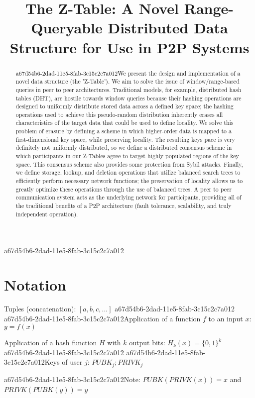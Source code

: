 \documentclass[12pt]{article}
\title{The Z-Table: A Novel Range-Queryable Distributed Data Structure for Use in P2P Systems}
\begin{document}
\maketitle

\begin{abstract}
a67d54b6-2dad-11e5-8fab-3c15c2c7a012We present the design and implementation of a novel data structure (the 'Z-Table'). We aim to solve the issue of window/range-based queries in peer to peer architectures. Traditional models, for example,  distributed hash tables (DHT), are hostile towards window queries because their hashing operations are designed to uniformly distribute stored data across a defined key space; the hashing operations used to achieve this pseudo-random distribution inherently erases all characteristics of the target data that could be used to define locality. We solve this problem of erasure by defining a scheme in which higher-order data is mapped to a first-dimensional key space, while preserving locality. The resulting keys pace is very definitely not uniformly distributed, so we define a distributed consensus scheme in which participants in our Z-Tables agree to target highly populated regions of the key space. This consensus scheme also provides some protection from Sybil attacks. Finally, we define storage, lookup, and deletion operations that utilize balanced search trees to efficiently perform necessary network functions; the preservation of locality allows us to greatly optimize these operations through the use of balanced trees. A peer to peer communication system acts as the underlying network for participants, providing all of the traditional benefits of a P2P architecture (fault tolerance, scalability, and truly independent operation).
\end{abstract}
a67d54b6-2dad-11e5-8fab-3c15c2c7a012
\section{Notation}

Tuples (concatenation): $[a,b,c,...]$
a67d54b6-2dad-11e5-8fab-3c15c2c7a012
a67d54b6-2dad-11e5-8fab-3c15c2c7a012Application of a function $f$ to an input $x$: $y=f(x)$

Application of a hash function $H$ with $k$ output bits: $H_{k}(x) = \{0,1\}^k$
a67d54b6-2dad-11e5-8fab-3c15c2c7a012
a67d54b6-2dad-11e5-8fab-3c15c2c7a012Keys of user $j$: $ PUBK_j; PRIVK_j $

a67d54b6-2dad-11e5-8fab-3c15c2c7a012Note: $PUBK(PRIVK(x)) = x$ and $PRIVK(PUBK(y)) = y$~
\end{document}
